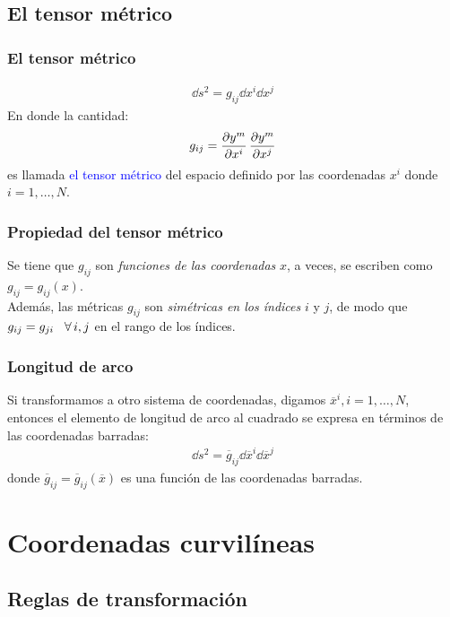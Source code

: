 \documentclass[12pt]{beamer}
\begin{document}
\subsection{El tensor métrico}

\begin{frame}
\frametitle{El tensor métrico}
\begin{align*}
\dd{s}^{2} = g_{ij} \dd{x}^{i} \dd{x}^{j}
\end{align*}
En donde la cantidad:
\pause
\begin{align}
g_{ij} = \pdv{y^{m}}{x^{i}} \, \pdv{y^{m}}{x^{j}}
\end{align}
\pause
es llamada \textcolor{blue}{el tensor métrico} del espacio definido por las coordenadas $x^{i}$ donde \hfill \break $i = 1, \ldots, N$.
\end{frame}
\begin{frame}
\frametitle{Propiedad del tensor métrico}
Se tiene que $g_{ij}$ son \emph{funciones de las coordenadas} $x$, a veces, se escriben como $g_{ij} = g_{ij} (x)$.
\\
\bigskip
\pause
Además, las métricas $g_{ij}$ son \emph{simétricas en los índices} $i$ y $j$, de modo que $g_{ij} = g_{ji} \hspace{0.3cm} \forall \, i, j$ en el rango de los índices.
\end{frame}
\begin{frame}
\frametitle{Longitud de arco}
Si transformamos a otro sistema de coordenadas, digamos $\overline{x}^{i}, i = 1, \ldots, N$, entonces el elemento de longitud de arco al cuadrado se expresa en términos de las coordenadas barradas:
\pause
\begin{align*}
\dd{s}^{2} = \overline{g}_{ij} \dd{\overline{x}}^{i} \dd{\overline{x}}^{j}
\end{align*}
donde $\overline{g}_{ij} = \overline{g}_{ij} (\overline{x})$ es una función de las coordenadas barradas.
\end{frame}

\section{Coordenadas curvilíneas}
\subsection{Reglas de transformación}
\end{document}
